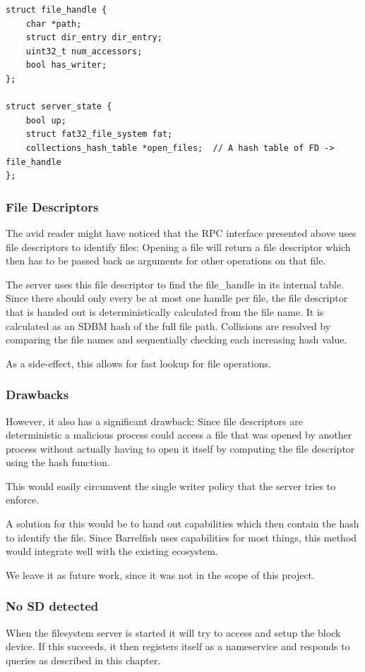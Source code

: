 \begin{verbatim}
struct file_handle {
    char *path;
    struct dir_entry dir_entry;
    uint32_t num_accessors;
    bool has_writer;
};

struct server_state {
    bool up;
    struct fat32_file_system fat;
    collections_hash_table *open_files;  // A hash table of FD -> file_handle
};
\end{verbatim}

\subsubsection{File Descriptors}
The avid reader might have noticed that the RPC interface presented above uses
file descriptors to identify files:
Opening a file will return a file descriptor which then has to be passed back as
arguments for other operations on that file.

The server uses this file descriptor to find the file\_handle in its internal
table.
Since there should only every be at most one handle per file, the file
descriptor that is handed out is deterministically calculated from the file
name.
It is calculated as an SDBM hash of the full file path.
Collisions are resolved by comparing the file names and sequentially checking
each increasing hash value.

As a side-effect, this allows for fast lookup for file operations.

\subsubsection{Drawbacks}
However, it also has a significant drawback:
Since file descriptors are deterministic a malicious process could access a file
that was opened by another process without actually having to open it itself by
computing the file descriptor using the hash function.

This would easily circumvent the single writer policy that the server tries to
enforce.

A solution for this would be to hand out capabilities which then contain the
hash to identify the file.
Since Barrelfish uses capabilities for most things, this method would integrate 
well with the existing ecosystem.

We leave it as future work, since it was not in the scope of this project.

\subsubsection{No SD detected}
When the filesystem server is started it will try to access and setup the block
device. If this succeeds, it then registers itself as a nameservice and responds
to queries as described in this chapter.

